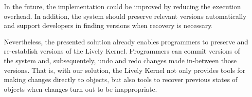 In the future, the implementation could be improved by reducing the execution overhead.
In addition, the system should preserve relevant versions automatically and support developers in finding versions when recovery is necessary.

Nevertheless, the presented solution already enables programmers to preserve and re-establish versions of the Lively Kernel.
Programmers can commit versions of the system and, subsequentely, undo and redo changes made in-between those versions.
That is, with our solution, the Lively Kernel not only provides tools for making changes directly to objects, but also tools to recover previous states of objects when changes turn out to be inappropriate.
